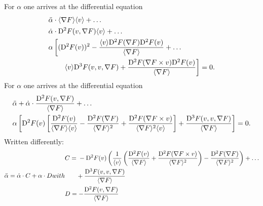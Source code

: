 For $ \alpha $ one arrives at the differential equation
\begin{align}
    &\ddot{ \alpha } \cdot \langle  \nabla F   \rangle \langle  v  \rangle  +  \dots\nonumber\\
    &\dot{ \alpha } \cdot \mathrm{D}^{ 2 } F ( v, \nabla F  ) \langle  v  \rangle  +  \dots\nonumber\\
    &\alpha \left[ ( \mathrm{D}^{ 2 } F ( v ) )^2  -
    \frac{ \langle  v  \rangle \mathrm{D}^{ 2 } F ( \nabla F  ) \mathrm{D}^{ 2 } F ( v ) }{ \langle  \nabla F   \rangle }  +  \dots\right.\nonumber\\
    &\qquad\left.\langle  v  \rangle \mathrm{D}^{ 3 } F ( v, v, \nabla F  )  +
    \frac{ \mathrm{D}^{ 2 } F ( \nabla F  \times v ) \mathrm{D}^{ 2 } F ( v ) }{ \langle  \nabla F   \rangle } \right]  =  0 .
\end{align}
For $ \alpha $ one arrives at the differential equation
\begin{align}
    &\ddot{ \alpha }  +  \dot{ \alpha } \cdot \frac{ \mathrm{D}^{ 2 } F ( v, \nabla F  ) }{ \langle  \nabla F   \rangle }  +  \dots\nonumber\\
    &\alpha \left[ \mathrm{D}^{ 2 } F ( v ) \left[ \frac{ \mathrm{D}^{ 2 } F ( v ) }{ \langle  \nabla F   \rangle \langle  v  \rangle }  -
    \frac{ \mathrm{D}^{ 2 } F ( \nabla F  ) }{ \langle  \nabla F   \rangle^2 }  +
    \frac{ \mathrm{D}^{ 2 } F ( \nabla F  \times v ) }{ \langle  \nabla F   \rangle^2 \langle  v  \rangle } \right]  +
    \frac{ \mathrm{D}^{ 3 } F ( v, v, \nabla F  ) }{ \langle  \nabla F   \rangle } \right]  =  0 .
\end{align}
Written differently:
\begin{subequations}
    \begin{align}
        \ddot{ \alpha }   =   \dot{ \alpha } \mult C  +  \alpha \mult D
    \end{align}
    with
    \begin{align}
        &\begin{aligned}
            C   &=
            {}-{} \diff{2}{F}( v )
            \left( \frac{ 1 }{ \skaq{v} }
            \left( \frac{ \diff{2}{F}( v ) }{ \skaq{\grad{F}} }  +
            \frac{ \diff{2}{F}( \grad{F} \times v ) }{ \skaq{\grad{F}}^2 } \right)  -
            \frac{ \diff{2}{F}( \grad{F} ) }{ \skaq{\grad{F}}^2 } \right)  +  \dots  \\
            &\hphantom{={}}
            + \frac{ \diff{3}{F}( v, v, \grad{F} ) }{ \skaq{\grad{F}} }
        \end{aligned}\\
        &D   =   - \frac{ \diff{2}{F}( v, \grad{F} ) }{ \skaq{\grad{F}} }
    \end{align}
\end{subequations}
